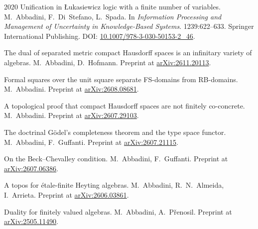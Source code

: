 \pubrow
  {2020}
  {Unification in {\L}ukasiewicz logic with a finite number of variables.}
  {M.\ Abbadini, F.\ Di~Stefano, L.\ Spada.}
  {In \emph{Information Processing and Management of Uncertainty in Knowledge-Based Systems}. 1239:622--633. Springer International Publishing. DOI: \href{https://doi.org/10.1007/978-3-030-50153-2_46}{10.1007/978-3-030-50153-2\_46}.}


\pubrow
  {}
  {The dual of separated metric compact Hausdorff spaces is an infinitary variety of algebras.}
  {M.\ Abbadini, D.\ Hofmann.}
  {Preprint at \href{https://arxiv.org/abs/2611.20113}{arXiv:2611.20113}.}

\pubrow
  {}
  {Formal squares over the unit square separate FS-domains from RB-domains.}
  {M.\ Abbadini.}
  {Preprint at \href{https://arxiv.org/abs/2608.08681}{arXiv:2608.08681}.}

\pubrow
  {}
  {A topological proof that compact Hausdorff spaces are not finitely co-concrete.}
  {M.\ Abbadini.}
  {Preprint at \href{https://arxiv.org/abs/2607.29103}{arXiv:2607.29103}.}

\pubrow
  {}
  {The doctrinal G\"odel's completeness theorem and the type space functor.}
  {M.\ Abbadini, F.\ Guffanti.}
  {Preprint at \href{https://arxiv.org/abs/2607.21115}{arXiv:2607.21115}.}

\pubrow
  {}
  {On the Beck--Chevalley condition.}
  {M.\ Abbadini, F.\ Guffanti.}
  {Preprint at \href{https://arxiv.org/abs/2607.06386}{arXiv:2607.06386}.}

\pubrow
  {}
  {A topos for \'etale-finite Heyting algebras.}
  {M.\ Abbadini, R.\ N.\ Almeida, I.\ Arrieta.}
  {Preprint at \href{https://arxiv.org/abs/2606.03861}{arXiv:2606.03861}.}

\pubrow
  {}
  {Duality for finitely valued algebras.}
  {M.\ Abbadini, A.\ P\v{r}enosil.}
  {Preprint at \href{https://arxiv.org/abs/2505.11490}{arXiv:2505.11490}.}
